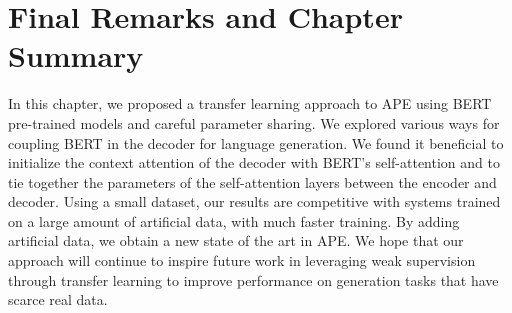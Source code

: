 \section{Final Remarks and Chapter Summary}

In this chapter, we proposed a transfer learning approach to APE
using BERT pre-trained models and careful parameter sharing. We
explored various ways for coupling BERT in the decoder for language
generation. We found it beneficial to initialize the context
attention of the decoder with BERT's self-attention and to tie
together the parameters of the self-attention layers between the
encoder and decoder. Using a small dataset, our results are
competitive with systems trained on a large amount of artificial
data, with much faster training. By adding artificial data, we obtain
a new state of the art in APE. We hope that our approach will
continue to inspire future work in leveraging weak supervision
through transfer learning to improve performance on generation tasks
that have scarce real data.

\cleardoublepage

\singlespacing